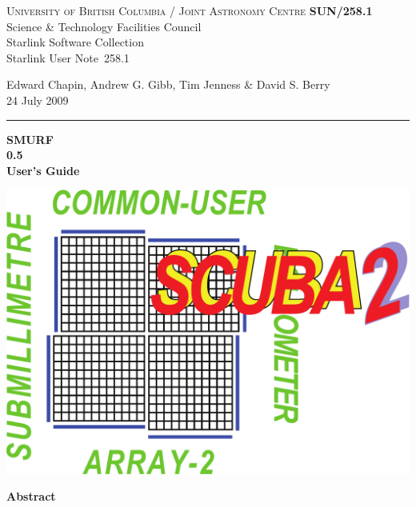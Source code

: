 \documentclass[twoside,11pt]{article}
\newcommand{\stardoccategory}  {Starlink User Note}
\newcommand{\stardocinitials}  {SUN}
\newcommand{\stardocnumber}    {258.1}
\newcommand{\stardocauthors}   {Edward Chapin, Andrew G. Gibb, Tim Jenness \& David S. Berry}
\newcommand{\stardocdate}      {24 July 2009}
\newcommand{\stardoctitle}     {SMURF}
\newcommand{\stardocversion}   {0.5}
\newcommand{\stardocmanual}    {User's Guide}
\newcommand{\stardocname}{\stardocinitials /\stardocnumber}
\newenvironment{latexonly}{}{}
\renewcommand{\_}{\texttt{\symbol{95}}}
\begin{document}
\thispagestyle{empty}

\begin{latexonly}
   \textsc{University of British Columbia} / \textsc{Joint Astronomy Centre} \hfill \textbf{\stardocname}\\
   {\large Science \& Technology Facilities Council}\\
   {\large Starlink Software Collection\\}
   {\large \stardoccategory\ \stardocnumber}
   \begin{flushright}
   \stardocauthors\\
   \stardocdate
   \end{flushright}
   \vspace{-4mm}
   \rule{\textwidth}{0.5mm}
   \vspace{5mm}
   \begin{center}
   {\Huge\textbf{\stardoctitle \\ [2.5ex]}}
   {\LARGE\textbf{\stardocversion \\ [4ex]}}
   {\Huge\textbf{\stardocmanual}}
   \end{center}
   \vspace{5mm}

\begin{center}
\includegraphics[scale=0.3]{sun258_logo}
\end{center}

   \vspace{10mm}
   \begin{center}
      {\Large\textbf{Abstract}}
   \end{center}
\end{latexonly}
\end{document}

